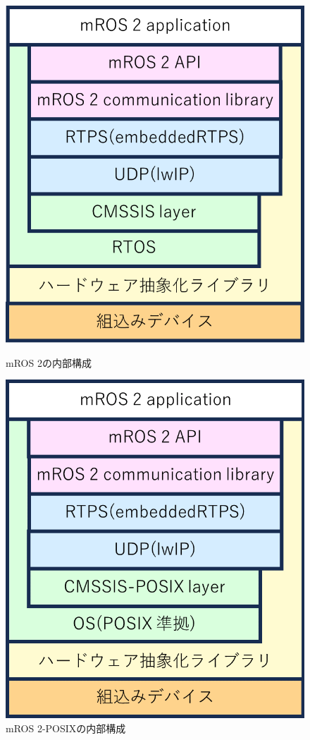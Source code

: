 \begin{figure}[ht]
    \centering
    \begin{minipage}{.48\textwidth}
        \centering
        \includegraphics[width=0.9\linewidth]{images/fig1_mros2_b.png}
        \caption{mROS 2の内部構成}
        \label{fig:subfig_a}
    \end{minipage}
    \hfill
    \begin{minipage}{.48\textwidth}
        \centering
        \includegraphics[width=0.9\linewidth]{images/fig1_mros2posix_a.png}
        \caption{mROS 2-POSIXの内部構成}
        \label{fig:subfig_b}
    \end{minipage}
\end{figure}
